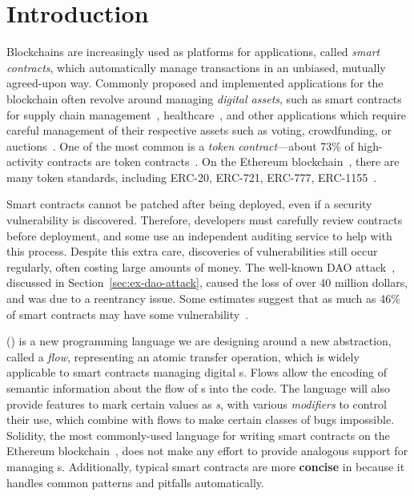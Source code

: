 \documentclass[dvipsnames, usenames, sigconf]{acmart}
\begin{document}

\maketitle

\section{Introduction}

Blockchains are increasingly used as platforms for applications, called \emph{smart contracts}, which automatically manage transactions in an unbiased, mutually agreed-upon way.
Commonly proposed and implemented applications for the blockchain often revolve around managing \emph{digital assets}, such as smart contracts for supply chain management~\cite{SupplyChainUse}, healthcare~\cite{HealthcareUse}, and other applications which require careful management of their respective assets such as voting, crowdfunding, or auctions~\cite{Elsden18:Making}.
One of the most common is a \emph{token contract}---about 73\% of high-activity contracts are token contracts~\cite{OlivaEtAl2019}.
On the Ethereum blockchain~\cite{wood2014ethereum}, there are many token standards, including ERC-20, ERC-721, ERC-777, ERC-1155~\cite{erc20,erc721,erc777,erc1155}.

Smart contracts cannot be patched after being deployed, even if a security vulnerability is discovered.
Therefore, developers must carefully review contracts before deployment, and some use an independent auditing service to help with this process.
Despite this extra care, discoveries of vulnerabilities still occur regularly, often costing large amounts of money.
The well-known DAO attack~\cite{DAO}, discussed in Section~\ref{sec:ex-dao-attack}, caused the loss of over 40 million dollars, and was due to a reentrancy issue.
Some estimates suggest that as much as 46\% of smart contracts may have some vulnerability~\cite{luuOyente}.

\langName (\langNamePronounce) is a new programming language we are designing around a new abstraction, called a \emph{flow}, representing an atomic transfer operation, which is widely applicable to smart contracts managing digital \assetTxt{}s.
Flows allow the encoding of semantic information about the flow of \assetTxt{}s into the code.
The \langName language will also provide features to mark certain values as \emph{\assetTxt{}s}, with various \emph{modifiers} to control their use, which combine with flows to make certain classes of bugs impossible.
Solidity, the most commonly-used language for writing smart contracts on the Ethereum blockchain~\cite{EthereumForDevs}, does not make any effort to provide analogous support for managing \assetTxt{}s.
Additionally, typical smart contracts are more \textbf{concise} in \langName because it handles common patterns and pitfalls automatically.
\end{document}
